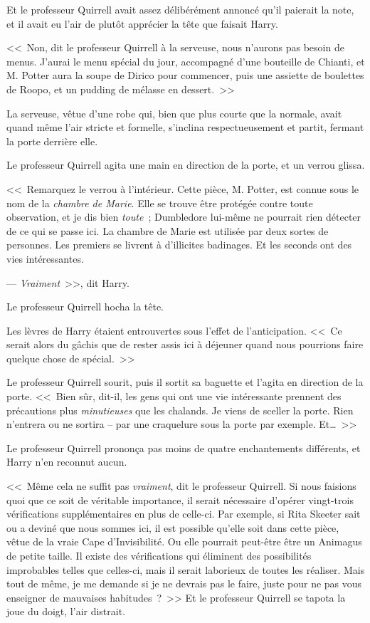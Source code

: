 Et le professeur Quirrell avait assez délibérément annoncé qu'il paierait la note, et il avait eu l'air de plutôt apprécier la tête que faisait Harry.

<<~Non, dit le professeur Quirrell à la serveuse, nous n'aurons pas besoin de menus. J'aurai le menu spécial du jour, accompagné d'une bouteille de Chianti, et M. Potter aura la soupe de Dirico pour commencer, puis une assiette de boulettes de Roopo, et un pudding de mélasse en dessert.~>>

La serveuse, vêtue d’une robe qui, bien que plus courte que la normale, avait quand même l'air stricte et formelle, s'inclina respectueusement et partit, fermant la porte derrière elle.

Le professeur Quirrell agita une main en direction de la porte, et un verrou glissa.

<<~Remarquez le verrou à l'intérieur. Cette pièce, M. Potter, est connue sous le nom de la \emph{chambre de Marie}. Elle se trouve être protégée contre toute observation, et je dis bien \emph{toute}~; Dumbledore lui-même ne pourrait rien détecter de ce qui se passe ici. La chambre de Marie est utilisée par deux sortes de personnes. Les premiers se livrent à d'illicites badinages. Et les seconds ont des vies intéressantes.

--- \emph{Vraiment}~>>, dit Harry.

Le professeur Quirrell hocha la tête.

Les lèvres de Harry étaient entrouvertes sous l'effet de l'anticipation. <<~Ce serait alors du gâchis que de rester assis ici à déjeuner quand nous pourrions faire quelque chose de spécial.~>>

Le professeur Quirrell sourit, puis il sortit sa baguette et l'agita en direction de la porte. <<~Bien sûr, dit-il, les gens qui ont une vie intéressante prennent des précautions plus \emph{minutieuses} que les chalands. Je viens de sceller la porte. Rien n'entrera ou ne sortira -- par une craquelure sous la porte par exemple. Et…~>>

Le professeur Quirrell prononça pas moins de quatre enchantements différents, et Harry n'en reconnut aucun.

<<~Même cela ne suffit pas \emph{vraiment}, dit le professeur Quirrell. Si nous faisions quoi que ce soit de véritable importance, il serait nécessaire d'opérer vingt-trois vérifications supplémentaires en plus de celle-ci. Par exemple, si Rita Skeeter sait ou a deviné que nous sommes ici, il est possible qu'elle soit dans cette pièce, vêtue de la vraie Cape d'Invisibilité. Ou elle pourrait peut-être être un Animagus de petite taille. Il existe des vérifications qui éliminent des possibilités improbables telles que celles-ci, mais il serait laborieux de toutes les réaliser. Mais tout de même, je me demande si je ne devrais pas le faire, juste pour ne pas vous enseigner de mauvaises habitudes~?~>> Et le professeur Quirrell se tapota la joue du doigt, l'air distrait.

